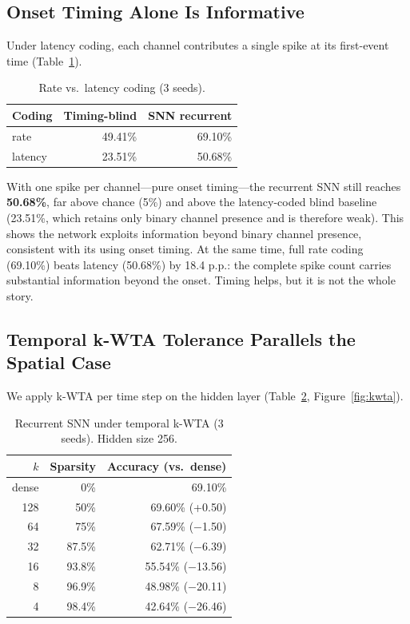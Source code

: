 \documentclass[11pt]{article}
\begin{document}
\subsection{Onset Timing Alone Is Informative}
\label{subsec:latency}
Under latency coding, each channel contributes a single spike at its first-event time (Table~\ref{tab:latency}).

\begin{table}[tbp]
\centering\small
\caption{Rate vs.\ latency coding (3 seeds).}
\label{tab:latency}
\begin{tabular}{lrr}
\toprule
Coding & Timing-blind & SNN recurrent \\
\midrule
rate    & 49.41\% & 69.10\% \\
latency & 23.51\% & 50.68\% \\
\bottomrule
\end{tabular}
\end{table}

With one spike per channel---pure onset timing---the recurrent SNN still reaches \textbf{50.68\%}, far above chance (5\%) and above the latency-coded blind baseline (23.51\%, which retains only binary channel presence and is therefore weak). This shows the network exploits information beyond binary channel presence, consistent with its using onset timing. At the same time, full rate coding (69.10\%) beats latency (50.68\%) by 18.4 p.p.: the complete spike count carries substantial information beyond the onset. Timing helps, but it is not the whole story.

\subsection{Temporal k-WTA Tolerance Parallels the Spatial Case}
\label{subsec:kwta}
We apply k-WTA per time step on the hidden layer (Table~\ref{tab:kwta}, Figure~\ref{fig:kwta}).

\begin{table}[tbp]
\centering\small
\caption{Recurrent SNN under temporal k-WTA (3 seeds). Hidden size 256.}
\label{tab:kwta}
\begin{tabular}{rrr}
\toprule
$k$ & Sparsity & Accuracy (vs.\ dense) \\
\midrule
dense & 0\%    & 69.10\% \\
128 & 50\%     & 69.60\% (+0.50) \\
64  & 75\%     & 67.59\% ($-$1.50) \\
32  & 87.5\%   & 62.71\% ($-$6.39) \\
16  & 93.8\%   & 55.54\% ($-$13.56) \\
8   & 96.9\%   & 48.98\% ($-$20.11) \\
4   & 98.4\%   & 42.64\% ($-$26.46) \\
\bottomrule
\end{tabular}
\end{table}
\end{document}

